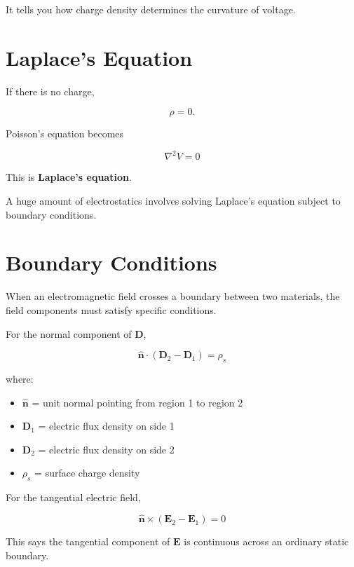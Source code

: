 \documentclass[11pt]{article}
\newcommand{\vect}[1]{\mathbf{#1}}
\begin{document}
It tells you how charge density determines the curvature of voltage.



\section{Laplace's Equation}

If there is no charge,

\[
\rho=0.
\]

Poisson's equation becomes

\[
\boxed{
\nabla^2V=0
}
\]

This is \textbf{Laplace's equation}.

A huge amount of electrostatics involves solving Laplace's equation subject to boundary conditions.



\section{Boundary Conditions}

When an electromagnetic field crosses a boundary between two materials, the field components must satisfy specific conditions.

For the normal component of $\vect{D}$,

\[
\boxed{
\hat{\vect{n}}
\cdot
(\vect{D}_2-\vect{D}_1)
=
\rho_s
}
\]

where:

\begin{itemize}
    \item $\hat{\vect{n}}$ = unit normal pointing from region 1 to region 2
    \item $\vect{D}_1$ = electric flux density on side 1
    \item $\vect{D}_2$ = electric flux density on side 2
    \item $\rho_s$ = surface charge density
\end{itemize}

For the tangential electric field,

\[
\boxed{
\hat{\vect{n}}
\times
(\vect{E}_2-\vect{E}_1)
=
0
}
\]

This says the tangential component of $\vect{E}$ is continuous across an ordinary static boundary.
\end{document}
